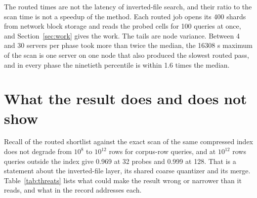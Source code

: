 \documentclass[sigconf, nonacm]{acmart}
\begin{document}
The routed times are not the latency of inverted-file search, and their ratio to the scan time is
not a speedup of the method. Each routed job opens its 400 shards from network block storage and
reads the probed cells for 100 queries at once, and Section~\ref{sec:work} gives the work. The tails
are node variance. Between 4 and 30 servers per phase took more than twice the median, the 16308 s
maximum of the scan is one server on one node that also produced the slowest routed pass, and in
every phase the ninetieth percentile is within 1.6 times the median.

\section{What the result does and does not show}
\label{sec:limits}

Recall of the routed shortlist against the exact scan of the same compressed index does not degrade
from $10^{8}$ to $10^{12}$ rows for corpus-row queries, and at $10^{12}$ rows queries outside the
index give 0.969 at 32 probes and 0.999 at 128. That is a statement about the inverted-file layer,
its shared coarse quantizer and its merge. Table~\ref{tab:threats} lists what could make the result
wrong or narrower than it reads, and what in the record addresses each.
\end{document}
